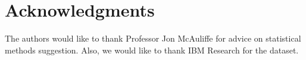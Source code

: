 \documentclass[english]{article}
\numberwithin{equation}{section}
\numberwithin{table}{section}
\numberwithin{figure}{section}
\begin{document}
\section*{Acknowledgments}
\hspace{12 pt}
The authors would like to thank Professor Jon McAuliffe for advice on
statistical methods suggestion. Also, we would like to thank IBM
Research for the dataset.


\appendix
%




\end{document}

